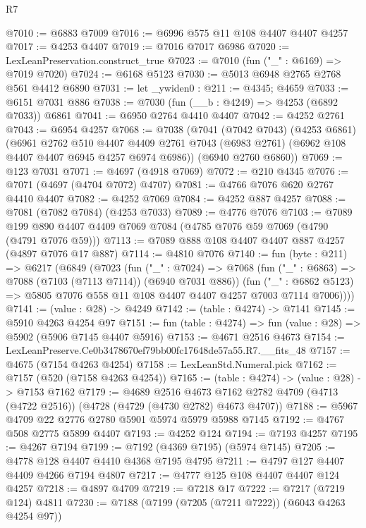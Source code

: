 \begin{lexlean}{R7}
\begin{coremodule}
@7010 := @6883 @7009
@7016 := @6996 @575 @11 @108 @4407 @4407 @4257
@7017 := @4253 @4407
@7019 := @7016 @7017 @6986
@7020 := LexLeanPreservation.construct_true
@7023 := @7010 (fun ("_" : @6169) => @7019 @7020)
@7024 := @6168 @5123
@7030 := @5013 @6948 @2765 @2768 @561 @4412 @6890
@7031 := let _ywiden0 : @211 := @4345; @4659
@7033 := @6151 @7031 @886
@7038 := @7030 (fun (__b : @4249) => @4253 (@6892 @7033)) @6861
@7041 := @6950 @2764 @4410 @4407
@7042 := @4252 @2761
@7043 := @6954 @4257
@7068 := @7038
    (@7041
      (@7042 @7043)
      (@4253 @6861)
      (@6961
        @2762
        @510
        @4407
        @4409
        @2761
        @7043
        (@6983 @2761)
        (@6962 @108 @4407 @4407 @6945 @4257 @6974 @6986))
      (@6940 @2760 @6860))
@7069 := @123 @7031
@7071 := @4697 (@4918 @7069)
@7072 := @210 @4345
@7076 := @7071 (@4697 (@4704 @7072) @4707)
@7081 := @4766 @7076 @620 @2767 @4410 @4407
@7082 := @4252 @7069
@7084 := @4252 @887 @4257
@7088 := @7081 (@7082 @7084) (@4253 @7033)
@7089 := @4776 @7076
@7103 := @7089 @199 @890 @4407 @4409 @7069 @7084 (@4785 @7076 @59 @7069 (@4790 (@4791 @7076 @59)))
@7113 := @7089 @888 @108 @4407 @4407 @887 @4257 (@4897 @7076 @17 @887)
@7114 := @4810 @7076
@7140 := fun (byte : @211) =>
  @6217
    (@6849
      (@7023
        (fun ("_" : @7024) =>
        @7068
          (fun ("_" : @6863) => @7088 (@7103 (@7113 @7114)) (@6940 @7031 @886))
          (fun ("_" : @6862 @5123) =>
          @5805 @7076 @558 @11 @108 @4407 @4407 @4257 @7003 @7114 @7006))))
@7141 := (value : @28) -> @4249
@7142 := (table : @4274) -> @7141
@7145 := @5910 @4263 @4254 @97
@7151 := fun (table : @4274) => fun (value : @28) => @5902 (@5906 @7145 @4407 @5916)
@7153 := @4671 @2516 @4673
@7154 := LexLeanPreserve.Ce0b3478670ef79bb00fc17648de57a55.R7.__fits_48
@7157 := @4675 (@7154 @4263 @4254)
@7158 := LexLeanStd.Numeral.pick
@7162 := @7157 (@520 (@7158 @4263 @4254))
@7165 := (table : @4274) -> (value : @28) -> @7153 @7162
@7179 := @4689
    @2516
    @4673
    @7162
    @2782
    @4709
    (@4713 (@4722 @2516))
    (@4728 (@4729 (@4730 @2782) @4673 @4707))
@7188 := @5967 @4709 @22 @2776 @2780 @5901 @5974 @5979 @5988 @7145
@7192 := @4767 @508 @2775 @5899 @4407
@7193 := @4252 @124
@7194 := @7193 @4257
@7195 := @4267 @7194
@7199 := @7192 (@4369 @7195) (@5974 @7145)
@7205 := @4778 @128 @4407 @4410 @4368 @7195 @4795
@7211 := @4797 @127 @4407 @4409 @4266 @7194 @4807
@7217 := @4777 @125 @108 @4407 @4407 @124 @4257
@7218 := @4897 @4709
@7219 := @7218 @17
@7222 := @7217 (@7219 @124) @4811
@7230 := @7188 (@7199 (@7205 (@7211 @7222)) (@6043 @4263 @4254 @97))

\end{coremodule}
\end{lexlean}
